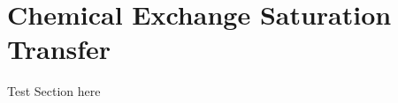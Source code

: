 
\chapter{Chemical Exchange Saturation Transfer}
\label{ch:CEST}

Test Section here

\endinput

Any text after an \endinput is ignored.
You could put scraps here or things in progress.
